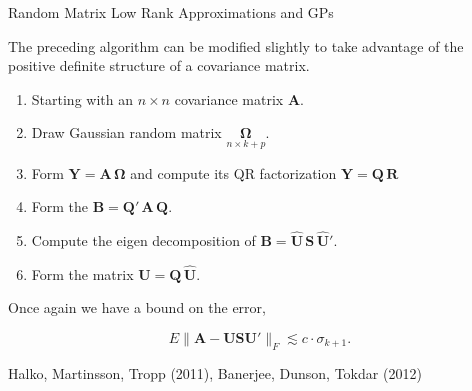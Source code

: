 \documentclass[11pt,ignorenonframetext,]{beamer}
\providecommand{\tightlist}{%
  \setlength{\itemsep}{0pt}\setlength{\parskip}{0pt}}
\begin{document}
\begin{frame}{Random Matrix Low Rank Approximations and GPs}
\protect\hypertarget{random-matrix-low-rank-approximations-and-gps}{}

The preceding algorithm can be modified slightly to take advantage of
the positive definite structure of a covariance matrix.

\begin{enumerate}
\tightlist
\item
  Starting with an \(n \times n\) covariance matrix \(\symbf{A}\).
\end{enumerate}

\pause

\begin{enumerate}
\setcounter{enumi}{1}
\tightlist
\item
  Draw Gaussian random matrix
  \(\underset{n \times k+p}{\symbf{\Omega}}\).
\end{enumerate}

\pause

\begin{enumerate}
\setcounter{enumi}{2}
\tightlist
\item
  Form \(\symbf{Y} = \symbf{A}\,\symbf{\Omega}\) and compute its QR
  factorization \(\symbf{Y} = \symbf{Q}\,\symbf{R}\)
\end{enumerate}

\pause

\begin{enumerate}
\setcounter{enumi}{3}
\tightlist
\item
  Form the \(\symbf{B}=\symbf{Q}'\,\symbf{A} \, \symbf{Q}\).
\end{enumerate}

\pause

\begin{enumerate}
\setcounter{enumi}{4}
\tightlist
\item
  Compute the eigen decomposition of
  \(\symbf{B} = \symbf{\hat{U}}\,\symbf{S}\,\symbf{\hat{U}}'\).
\end{enumerate}

\pause

\begin{enumerate}
\setcounter{enumi}{5}
\tightlist
\item
  Form the matrix \(\symbf{U} = \symbf{Q} \, \symbf{\hat{U}}\).
\end{enumerate}

\pause

Once again we have a bound on the error,

\[
  E \|\symbf{A} - \symbf{U}\symbf{S}\symbf{U}'\|_F 
\lesssim c \cdot \sigma_{k+1}. 
\]

\begin{center}
Halko, Martinsson, Tropp (2011), Banerjee, Dunson, Tokdar (2012)
\end{center}

\end{frame}
\end{document}
